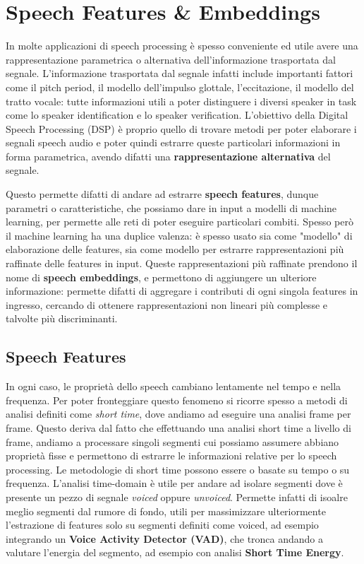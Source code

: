 \chapter{Speech Features \& Embeddings}
\label{ch:features}
In molte applicazioni di speech processing è spesso conveniente ed utile avere una rappresentazione parametrica o alternativa dell'informazione
trasportata dal segnale. L'informazione trasportata dal segnale infatti include importanti fattori come il pitch period, il modello dell'impulso glottale,
l'eccitazione, il modello del tratto vocale: tutte informazioni utili a poter distinguere i diversi speaker in task come lo speaker identification
e lo speaker verification. L'obiettivo della Digital Speech Processing (DSP) è proprio quello di trovare metodi per poter elaborare i segnali speech audio
e poter quindi estrarre queste particolari informazioni in forma parametrica, avendo difatti una \textbf{rappresentazione alternativa} del segnale. 

Questo permette difatti di andare ad estrarre \textbf{speech features}, dunque parametri o caratteristiche, che possiamo dare in input a modelli di machine learning,
per permette alle reti di poter eseguire particolari combiti. Spesso però il machine learning ha una duplice valenza: è spesso usato sia come "modello" di elaborazione
delle features, sia come modello per estrarre rappresentazioni più raffinate delle features in input. Queste rappresentazioni più raffinate prendono il nome
di \textbf{speech embeddings}, e permettono di aggiungere un ulteriore informazione: permette difatti di aggregare i contributi di ogni singola features in ingresso,
cercando di ottenere rappresentazioni non lineari più complesse e talvolte più discriminanti.

\section{Speech Features}
In ogni caso, le proprietà dello speech cambiano lentamente nel tempo e nella frequenza. Per poter fronteggiare questo fenomeno si ricorre spesso a
metodi di analisi definiti come \textit{short time}, dove andiamo ad eseguire una analisi frame per frame. Questo deriva dal fatto che effettuando una analisi
short time a livello di frame, andiamo a processare singoli segmenti cui possiamo assumere abbiano proprietà fisse e permettono di estrarre le informazioni relative
per lo speech processing. Le metodologie di short time possono essere o basate su tempo o su frequenza. L'analisi time-domain è utile per andare ad isolare
segmenti dove è presente un pezzo di segnale \textit{voiced} oppure \textit{unvoiced}. Permette infatti di isoalre meglio segmenti dal rumore di fondo, utili per massimizzare
ulteriormente l'estrazione di features solo su segmenti definiti come voiced, ad esempio integrando un \textbf{Voice Activity Detector (VAD)}, che tronca andando a valutare
l'energia del segmento, ad esempio con analisi \textbf{Short Time Energy}. 

